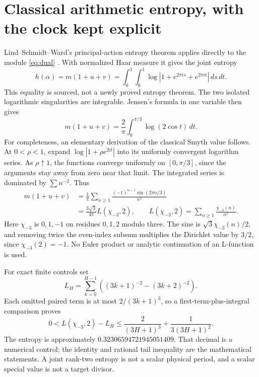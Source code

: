 \documentclass[10pt]{article}
\begin{document}
\section{Classical arithmetic entropy, with the clock kept explicit}
Lind--Schmidt--Ward's principal-action entropy theorem applies directly
to the module \eqref{eq:dual} \cite[Theorem 3.1]{lsw}. With normalized
Haar measure it gives the joint entropy
\begin{equation}\label{eq:entropy}
 h(\alpha)=m(1+u+v)=
 \int_0^1\int_0^1\log|1+e^{2\pi is}+e^{2\pi it}|\,ds\,dt.
\end{equation}
This equality is sourced, not a newly proved entropy theorem. The two
isolated logarithmic singularities are integrable. Jensen's formula in
one variable then gives
\begin{equation}\label{eq:jensen}
 m(1+u+v)=\frac2\pi\int_0^{\pi/3}\log(2\cos t)\,dt.
\end{equation}
For completeness, an elementary derivation of the classical Smyth value
\cite{smyth} follows. At $0<\rho<1$, expand
$\log|1+\rho e^{2it}|$ into its uniformly convergent logarithm series.
As $\rho\uparrow1$, the functions converge uniformly on $[0,\pi/3]$,
since the arguments stay away from zero near that limit. The integrated
series is dominated by $\sum n^{-2}$. Thus
\begin{align}
 m(1+u+v)
 &=\frac1\pi\sum_{n\ge1}
 \frac{(-1)^{n-1}\sin(2\pi n/3)}{n^2}\nonumber\\
 &=\frac{3\sqrt3}{4\pi}L(\chi_{-3},2),\qquad
 L(\chi_{-3},2)=\sum_{n\ge1}\frac{\chi_{-3}(n)}{n^2}.
 \label{eq:smyth}
\end{align}
Here $\chi_{-3}$ is $0,1,-1$ on residues $0,1,2$ modulo three.
The sine is $\sqrt3\chi_{-3}(n)/2$, and removing twice the even-index
subsum multiplies the Dirichlet value by $3/2$, since $\chi_{-3}(2)=-1$.
No Euler product or analytic continuation of an L-function is used.

For exact finite controls set
\[
 L_H=\sum_{k=0}^{H-1}\left((3k+1)^{-2}-(3k+2)^{-2}\right).
\]
Each omitted paired term is at most $2/(3k+1)^3$, so a first-term-plus-integral
comparison proves
\begin{equation}\label{eq:tail}
 0<L(\chi_{-3},2)-L_H\le
 \frac2{(3H+1)^3}+\frac1{3(3H+1)^2}.
\end{equation}
The entropy is approximately $0.32306594721945051409$. That decimal is a
numerical control; the identity and rational tail inequality are the
mathematical statements. A joint rank-two entropy is not a scalar physical
period, and a scalar special value is not a target divisor.
\end{document}
